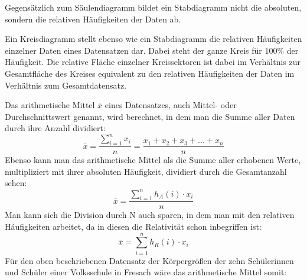 \pagebreak


Gegens\"{a}tzlich zum S\"{a}ulendiagramm bildet ein Stabdiagramm nicht die absoluten, sondern die relativen H\"{a}ufigkeiten der Daten ab.

\begin{figure}[h!]
\end{figure} 


Ein Kreisdiagramm stellt ebenso wie ein Stabdiagramm die relativen H\"{a}ufigkeiten einzelner Daten eines Datensatzen dar. Dabei steht der ganze Kreis f\"{u}r $100 \%$ der H\"{a}ufigkeit. Die relative Fl\"{a}che einzelner Kreissektoren ist dabei im Verh\"{a}ltnis zur Gesamtfl\"{a}che des Kreises equivalent zu den relativen H\"{a}ufigkeiten der Daten im Verh\"{a}ltnis zum Gesamtdatensatz.

\begin{figure}[h!]
\end{figure}

\pagebreak



Das arithmetische Mittel $\bar{x}$ eines Datensatzes, auch Mittel- oder Durchschnittswert genannt, wird berechnet, in dem man die Summe aller Daten durch ihre Anzahl dividiert: $$\bar{x} = \frac{\sum_{i=1}^{n} x_i}{n} = \frac{x_{1} + x_{2} + x_{3} + ... + x_{n}}{n}$$ Ebenso kann man das arithmetische Mittel als die Summe aller erhobenen Werte, multipliziert mit ihrer absoluten H\"{a}ufigkeit, dividiert durch die Gesamtanzahl sehen: $$\bar{x} = \frac{\sum_{i=1}^{n} h_{A}(i) \cdot x_{i}}{n}$$ Man kann sich die Division durch N auch sparen, in dem man mit den relativen H\'{a}ufigkeiten arbeitet, da in diesen die Relativit\"{a}t schon inbegriffen ist: $$\bar{x} = \sum_{i=1}^{n} h_{R}(i) \cdot x_{i}$$ F\"{u}r den oben beschriebenen Datensatz der K\"{o}rpergr\"{o}\ss{}en der zehn Sch\"{u}lerinnen und Sch\"{u}ler einer Volksschule in Fresach w\"{a}re das arithmetische Mittel somit: 

